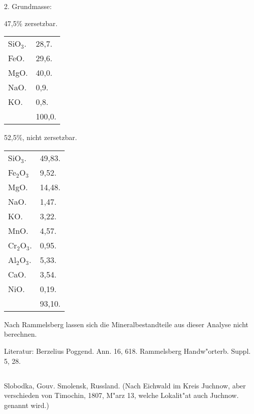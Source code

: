 \documentclass[a4paper, 11pt, oneside]{article}
\begin{document}
2. Grundmasse:
\begin{center}
47,5\% zersetzbar.
\end{center}

\begin{table}[!ht]
    \centering\swabfamily\Large
    \begin{tabular}{l l}
        SiO$_{3}$. & 28,7. \\
        FeO. & 29,6. \\
        MgO. & 40,0. \\
        NaO. & 0,9. \\
        KO. & 0,8. \\
        & 100,0. \\
    \end{tabular}
\end{table}

\begin{center}
52,5\%, nicht zersetzbar.
\end{center}
\begin{table}[!ht]
    \centering\swabfamily\Large
    \begin{tabular}{l l}
        SiO$_{3}$. & 49,83. \\
        Fe$_{2}$O$_{3}$ & 9,52. \\
        MgO. & 14,48. \\
        NaO. & 1,47. \\
        KO. & 3,22. \\
        MnO. & 4,57. \\
        Cr$_{2}$O$_{3}$. & 0,95. \\
        Al$_{2}$O$_{3}$. & 5,33. \\
        CaO. & 3,54. \\
        NiO. & 0,19. \\
         &  93,10. \\
    \end{tabular}
\end{table}

Nach Rammelsberg lassen sich die Mineralbestandteile aus dieser Analyse nicht berechnen.

\normalsize
Literatur: Berzelius Poggend. Ann. 16, 618. Rammelsberg Handw"orterb. Suppl. 5, 28.
\subsection{}
\LARGE
\paragraph{}
Slobodka, Gouv. Smolensk, Russland. (Nach Eichwald im Kreis Juchnow, aber verschieden von Timochin, 1807, M"arz 13, welche Lokalit"at auch Juchnow. genannt wird.)
\end{document}
